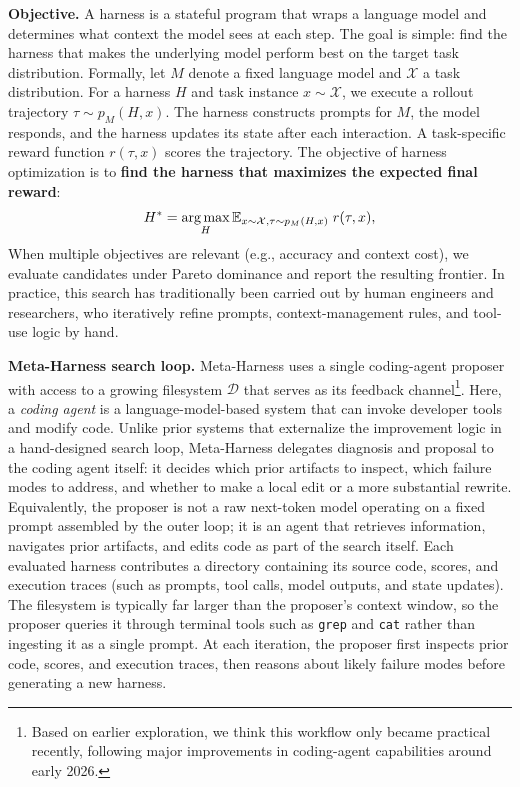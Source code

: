 \documentclass{article}
\begin{document}
\textbf{Objective.}
A harness is a stateful program that wraps a language model and determines what context the model sees at each step.
The goal is simple: find the harness that makes the underlying model perform best on the target task distribution.
Formally, let $M$ denote a fixed language model and $\mathcal{X}$ a task distribution.
For a harness $H$ and task instance $x \sim \mathcal{X}$, we execute a rollout trajectory $\tau \sim p_M(H, x)$.
The harness constructs prompts for $M$, the model responds, and the harness updates its state after each interaction.
A task-specific reward function $r(\tau, x)$ scores the trajectory.
The objective of harness optimization is to \textbf{find the harness that maximizes the expected final reward}:
\[
H^* = \operatorname*{arg\,max}_{H} \mathbb{E}_{x \sim \mathcal{X}, \tau \sim p_M(H, x)} \; r(\tau, x),
\]
When multiple objectives are relevant (e.g., accuracy and context cost), we evaluate candidates under Pareto dominance and report the resulting frontier.
In practice, this search has traditionally been carried out by human engineers and researchers, who iteratively refine prompts, context-management rules, and tool-use logic by hand.

\textbf{Meta-Harness search loop.}
Meta-Harness uses a single coding-agent proposer with access to a growing filesystem $\mathcal{D}$ that serves as its feedback channel\footnote{Based on earlier exploration, we think this workflow only became practical recently, following major improvements in coding-agent capabilities around early 2026.}.
Here, a \textit{coding agent} is a language-model-based system that can invoke developer tools and modify code.
Unlike prior systems that externalize the improvement logic in a hand-designed search loop, Meta-Harness delegates diagnosis and proposal to the coding agent itself: it decides which prior artifacts to inspect, which failure modes to address, and whether to make a local edit or a more substantial rewrite.
Equivalently, the proposer is not a raw next-token model operating on a fixed prompt assembled by the outer loop; it is an agent that retrieves information, navigates prior artifacts, and edits code as part of the search itself.
Each evaluated harness contributes a directory containing its source code, scores, and execution traces (such as prompts, tool calls, model outputs, and state updates).
The filesystem is typically far larger than the proposer's context window, so the proposer queries it through terminal tools such as \texttt{grep} and \texttt{cat} rather than ingesting it as a single prompt.
At each iteration, the proposer first inspects prior code, scores, and execution traces, then reasons about likely failure modes before generating a new harness.
\end{document}
